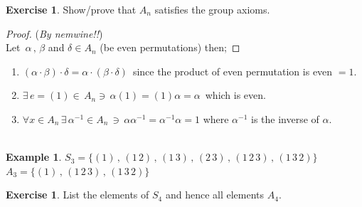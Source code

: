 \documentclass[11pt,a4paper]{article}
\theoremstyle{definition}
\newtheorem{exa}[thm]{Example}
\newtheorem{exe}[thm]{Exercise}
\begin{document}
\begin{exe}
Show/prove that $A_n$ satisfies the group axioms.\\


\begin{proof}
(\textit{By nemwine!!})\\
Let $\, \alpha\, , \, \beta $ and $\delta \in A_n$ (be even permutations) then;
\end{proof}
\begin{enumerate}
\item[(i)] $(\alpha\cdot\beta)\cdot \delta = \alpha\cdot(\beta\cdot\delta)\,$ since the product of even permutation is even $= 1$.
\item[(ii)] $\exists\, e = (1)\in \, A_n \ni \, \alpha(1) = (1)\alpha = \alpha\,$ which is even.
\item[(iii)] $\forall x\in A_n\, \exists \, \alpha^{-1}\in A_n\,\ni\, \alpha\alpha^{-1} = \alpha^{-1}\alpha = 1$ where $\alpha^{-1}$ is the inverse of $\alpha$.\\\\
\end{enumerate}
\end{exe}






\begin{exa}
$S_3 =\{(1)\, , \, (1\,2)\, , \, (1\,3)\, , \, (2\, 3)\,  ,\, (1\, 2\, 3)\, , \, (1\, 3\, 2)\}$\hspace{1cm}
$A_3 = \{(1)\, , \, (1\, 2\, 3)\, ,\, (1\,3\, 2)\}$\\
\end{exa}




\begin{exe}
List the elements of $S_4$ and hence all elements $A_4$.\\
\end{exe}
\end{document}
